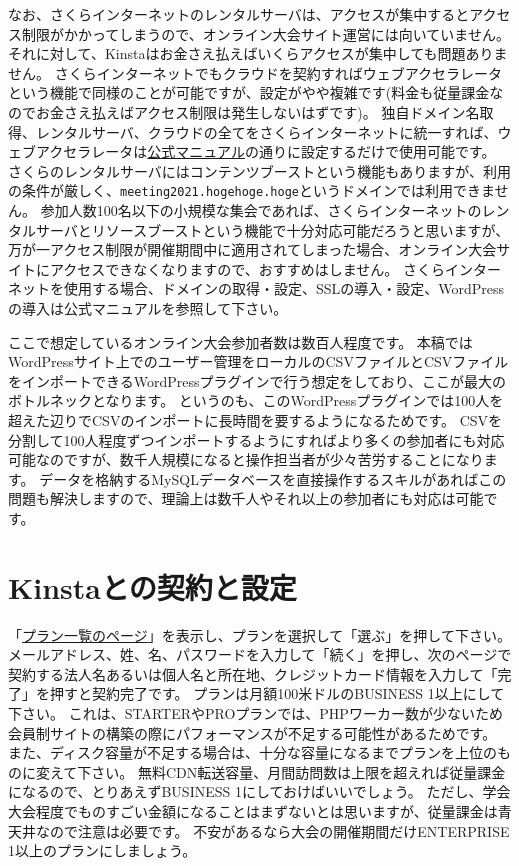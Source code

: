 \documentclass[titlepage,10pt,a4paper,uplatex]{jsbook}
\begin{document}
なお、さくらインターネットのレンタルサーバは、アクセスが集中するとアクセス制限がかかってしまうので、オンライン大会サイト運営には向いていません。
それに対して、Kinstaはお金さえ払えばいくらアクセスが集中しても問題ありません。
さくらインターネットでもクラウドを契約すればウェブアクセラレータという機能で同様のことが可能ですが、設定がやや複雑です(料金も従量課金なのでお金さえ払えばアクセス制限は発生しないはずです)。
独自ドメイン名取得、レンタルサーバ、クラウドの全てをさくらインターネットに統一すれば、ウェブアクセラレータは\href{https://manual.sakura.ad.jp/cloud/webaccel/manual/tips-settings-webaccel-for-rs.html}{公式マニュアル}の通りに設定するだけで使用可能です。
さくらのレンタルサーバにはコンテンツブーストという機能もありますが、利用の条件が厳しく、\texttt{meeting2021.hogehoge.hoge}というドメインでは利用できません。
参加人数100名以下の小規模な集会であれば、さくらインターネットのレンタルサーバとリソースブーストという機能で十分対応可能だろうと思いますが、万が一アクセス制限が開催期間中に適用されてしまった場合、オンライン大会サイトにアクセスできなくなりますので、おすすめはしません。
さくらインターネットを使用する場合、ドメインの取得・設定、SSLの導入・設定、WordPressの導入は公式マニュアルを参照して下さい。

ここで想定しているオンライン大会参加者数は数百人程度です。
本稿ではWordPressサイト上でのユーザー管理をローカルのCSVファイルとCSVファイルをインポートできるWordPressプラグインで行う想定をしており、ここが最大のボトルネックとなります。
というのも、このWordPressプラグインでは100人を超えた辺りでCSVのインポートに長時間を要するようになるためです。
CSVを分割して100人程度ずつインポートするようにすればより多くの参加者にも対応可能なのですが、数千人規模になると操作担当者が少々苦労することになります。
データを格納するMySQLデータベースを直接操作するスキルがあればこの問題も解決しますので、理論上は数千人やそれ以上の参加者にも対応は可能です。

\section{Kinstaとの契約と設定}

「\href{https://kinsta.com/jp/plans/}{プラン一覧のページ}」を表示し、プランを選択して「選ぶ」を押して下さい。
メールアドレス、姓、名、パスワードを入力して「続く」を押し、次のページで契約する法人名あるいは個人名と所在地、クレジットカード情報を入力して「完了」を押すと契約完了です。
プランは月額100米ドルのBUSINESS 1以上にして下さい。
これは、STARTERやPROプランでは、PHPワーカー数が少ないため会員制サイトの構築の際にパフォーマンスが不足する可能性があるためです。
また、ディスク容量が不足する場合は、十分な容量になるまでプランを上位のものに変えて下さい。
無料CDN転送容量、月間訪問数は上限を超えれば従量課金になるので、とりあえずBUSINESS 1にしておけばいいでしょう。
ただし、学会大会程度でものすごい金額になることはまずないとは思いますが、従量課金は青天井なので注意は必要です。
不安があるなら大会の開催期間だけENTERPRISE 1以上のプランにしましょう。
\end{document}
